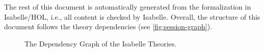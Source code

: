 \documentclass[10pt,DIV16,a4paper,abstract=true,twoside=semi,openright]{scrreprt}
\begin{document}
The rest of this document is automatically generated from the formalization in Isabelle/HOL, i.e., all content is checked by Isabelle.  Overall, the structure of this document follows the theory dependencies (see \autoref{fig:session-graph}).

\begin{sidewaysfigure}
  \centering
  \caption{The Dependency Graph of the Isabelle Theories.\label{fig:session-graph}}
\end{sidewaysfigure}

\nocite{foster.ea:efsm:2018}

\clearpage




{\small
  
  
}
\end{document}
